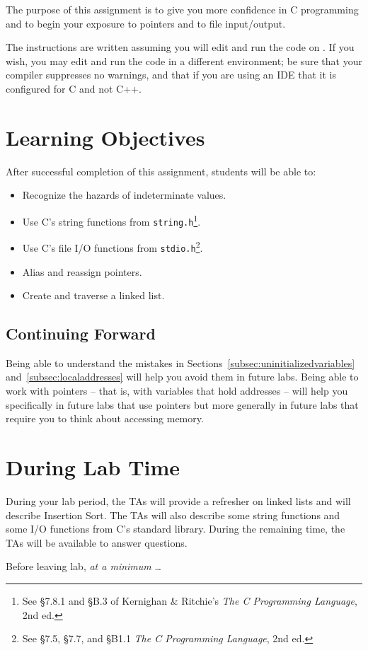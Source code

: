 The purpose of this assignment is to give you more confidence in C programming and to begin your exposure to pointers and to file input/output.

The instructions are written assuming you will edit and run the code on \runtimeenvironment.
If you wish, you may edit and run the code in a different environment;
be sure that your compiler suppresses no warnings, and that if you are using an IDE that it is configured for C and not C++.

\section*{Learning Objectives}

After successful completion of this assignment, students will be able to:
\begin{itemize}
    \item Recognize the hazards of indeterminate values.
    \item Use C's string functions from \lstinline{string.h}\footnote{See \S7.8.1 and \S{}B.3 of Kernighan \& Ritchie's \textit{The C Programming Language}, 2nd ed.}.
    \item Use C's file I/O functions from \lstinline{stdio.h}\footnote{See \S7.5, \S7.7, and \S{}B1.1 \textit{The C Programming Language}, 2nd ed.}.
    \item Alias and reassign pointers.
    \item Create and traverse a linked list.
\end{itemize}

\subsection*{Continuing Forward}

Being able to understand the mistakes in Sections~\ref{subsec:uninitializedvariables} and~\ref{subsec:localaddresses} will help you avoid them in future labs.
Being able to work with pointers -- that is, with variables that hold addresses -- will help you specifically in future labs that use pointers but more generally in future labs that require you to think about accessing memory.

\section*{During Lab Time}

During your lab period, the TAs will provide a refresher on linked lists and will describe Insertion Sort.
The TAs will also describe some string functions and some I/O functions from C's standard library.
During the remaining time, the TAs will be available to answer questions.

Before leaving lab, \textit{at a minimum} \dots

